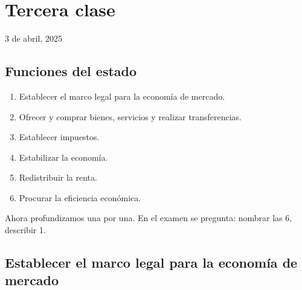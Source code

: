\section{Tercera clase}

3 de abril, 2025

\subsection{Funciones del estado}

\begin{enumerate}
    \item Establecer el marco legal para la economía de mercado.
    \item Ofrecer y comprar bienes, servicios y realizar transferencias.
    \item Establecer impuestos.
    \item Estabilizar la economía.
    \item Redistribuir la renta.
    \item Procurar la eficiencia económica.
\end{enumerate}

Ahora profundizamos una por una.
En el examen se pregunta: nombrar las 6, describir 1.

\subsection{Establecer el marco legal para la economía de mercado}

